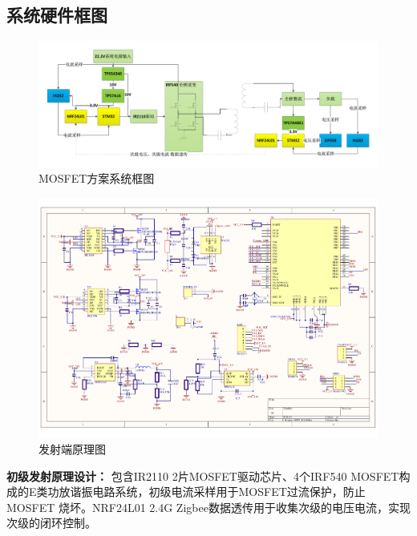 ﻿\documentclass[UTF-8,a4paper,12pt]{ctexart}
\begin{document}
    \subsection{系统硬件框图}

        \begin{figure}[H]
          \centering
          \includegraphics[width=18cm]{sys.pdf}
          \caption{MOSFET方案系统框图}
          \label{sch_MOSFET}
        \end{figure}
        
            \begin{figure}[H]
              \centering
              \includegraphics[width=12cm]{WPT_E1.pdf}
              \caption{发射端原理图}
              \label{发射端原理图}
            \end{figure}
            {\bf{初级发射原理设计：}}
                包含IR2110 2片MOSFET驱动芯片、4个IRF540 MOSFET构成的E类功放谐振电路系统，初级电流采样用于MOSFET过流保护，防止MOSFET 烧坏。NRF24L01 2.4G Zigbee数据透传用于收集次级的电压电流，实现次级的闭环控制。
\end{document}

